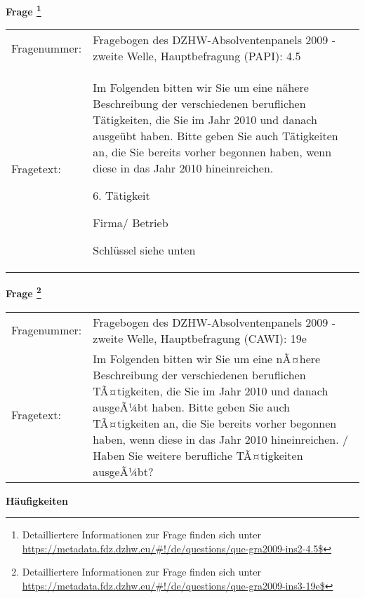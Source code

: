 				\vspace*{0.5cm}
                \noindent\textbf{Frage
	                \footnote{Detailliertere Informationen zur Frage finden sich unter
		              \url{https://metadata.fdz.dzhw.eu/\#!/de/questions/que-gra2009-ins2-4.5$}}}\\
				\begin{tabularx}{\hsize}{@{}lX}
					Fragenummer: &
					  Fragebogen des DZHW-Absolventenpanels 2009 - zweite Welle, Hauptbefragung (PAPI):
					  4.5
 \\
					Fragetext: & Im Folgenden bitten wir Sie um eine nähere Beschreibung der verschiedenen beruflichen Tätigkeiten, die Sie im Jahr 2010 und danach ausgeübt haben. Bitte geben Sie auch Tätigkeiten an, die Sie bereits vorher begonnen haben, wenn diese in das Jahr 2010 hineinreichen.\par  6. Tätigkeit\par  Firma/ Betrieb\par  Schlüssel siehe unten \\
				\end{tabularx}
				\vspace*{0.5cm}
                \noindent\textbf{Frage
	                \footnote{Detailliertere Informationen zur Frage finden sich unter
		              \url{https://metadata.fdz.dzhw.eu/\#!/de/questions/que-gra2009-ins3-19e$}}}\\
				\begin{tabularx}{\hsize}{@{}lX}
					Fragenummer: &
					  Fragebogen des DZHW-Absolventenpanels 2009 - zweite Welle, Hauptbefragung (CAWI):
					  19e
 \\
					Fragetext: & Im Folgenden bitten wir Sie um eine nÃ¤here Beschreibung der verschiedenen beruflichen TÃ¤tigkeiten, die Sie im Jahr 2010 und danach ausgeÃ¼bt haben. Bitte geben Sie auch TÃ¤tigkeiten an, die Sie bereits vorher begonnen haben, wenn diese in das Jahr 2010 hineinreichen. / Haben Sie weitere berufliche TÃ¤tigkeiten ausgeÃ¼bt? \\
				\end{tabularx}





        		\vspace*{0.5cm}
                \noindent\textbf{Häufigkeiten}

